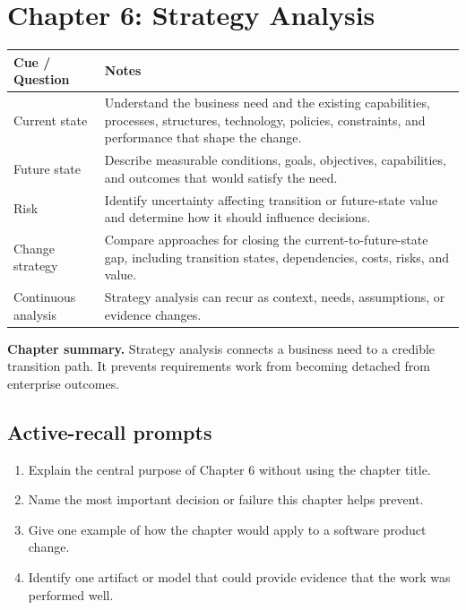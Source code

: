 \documentclass[11pt]{article}
\begin{document}
\section{Chapter 6: Strategy Analysis}
\begin{longtable}{L{0.26\textwidth} L{0.64\textwidth}}
\toprule
\textbf{Cue / Question} & \textbf{Notes}\\
\midrule
\endhead
Current state & Understand the business need and the existing capabilities, processes, structures, technology, policies, constraints, and performance that shape the change.\\
Future state & Describe measurable conditions, goals, objectives, capabilities, and outcomes that would satisfy the need.\\
Risk & Identify uncertainty affecting transition or future-state value and determine how it should influence decisions.\\
Change strategy & Compare approaches for closing the current-to-future-state gap, including transition states, dependencies, costs, risks, and value.\\
Continuous analysis & Strategy analysis can recur as context, needs, assumptions, or evidence changes.\\
\bottomrule
\end{longtable}
\begin{keybox}\textbf{Chapter summary.} Strategy analysis connects a business need to a credible transition path. It prevents requirements work from becoming detached from enterprise outcomes.\end{keybox}
\subsection*{Active-recall prompts}
\begin{enumerate}
\item Explain the central purpose of Chapter 6 without using the chapter title.
\item Name the most important decision or failure this chapter helps prevent.
\item Give one example of how the chapter would apply to a software product change.
\item Identify one artifact or model that could provide evidence that the work was performed well.
\end{enumerate}
\end{document}
